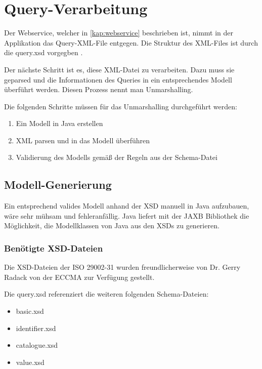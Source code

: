 \section{Query-Verarbeitung}\label{sec:query_vearbeitung}

Der \gls{Webservice}, welcher in \autoref{kap:webservice} beschrieben ist, nimmt in der Applikation das Query-XML-File entgegen. 
Die Struktur des XML-Files ist durch die query.xsd vorgegben \citep[27]{iso29002-31}. 

Der nächste Schritt ist es, diese XML-Datei zu verarbeiten. Dazu muss sie geparsed und die Informationen des Queries in ein entsprechendes Modell überführt werden. Diesen Prozess nennt man \gls{Unmarshalling}. 

Die folgenden Schritte müssen für das \gls{Unmarshalling} durchgeführt werden:

\begin{enumerate}
\item Ein Modell in Java erstellen
\item XML parsen und in das Modell überführen
\item Validierung des Modells gemäß der Regeln aus der Schema-Datei
\end{enumerate}

\subsection{Modell-Generierung}\label{sec:modellgenerierung}

Ein entsprechend valides Modell anhand der XSD manuell in Java aufzubauen, wäre sehr mühsam und fehleranfällig. Java liefert mit der \gls{JAXB} Bibliothek die Möglichkeit, die Modellklassen von Java aus den XSDs zu generieren.

\subsubsection{Benötigte XSD-Dateien}

Die XSD-Dateien der ISO 29002-31 wurden freundlicherweise von Dr. Gerry Radack von der \gls{ECCMA} zur Verfügung gestellt. 

Die query.xsd referenziert die weiteren folgenden Schema-Dateien:
\begin{multicols}{2}
\begin{itemize}
\item basic.xsd
\item identifier.xsd
\item catalogue.xsd
\item value.xsd
\end{itemize}
\end{multicols}

